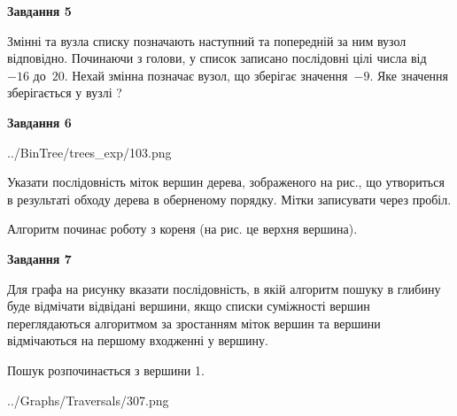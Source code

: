 \documentclass[12pt, ukrainian]{article}
\begin{document}
{\begin {large}
{\begin {center}\textbf{Завдання 5}\end {center}}\par
Змінні  та  вузла списку позначають наступний та попередній за ним вузол відповідно. Починаючи з голови, у список записано послідовні цілі числа від~$-16$ до~$20$. Нехай змінна  позначає вузол, що зберігає значення~$-9$.
Яке значення зберігається у вузлі  ?\par
\newpage

{\begin {center}\textbf{Завдання 6}\end {center}}\par

\begin{center}
	{../BinTree/trees_exp/103.png}
\end{center}
Указати послідовність міток вершин дерева, зображеного на рис., що утвориться в результаті обходу дерева в оберненому порядку. Мітки записувати через пробіл.\par Алгоритм починає роботу з кореня (на рис. це верхня вершина).\par
\newpage

{\begin {center}\textbf{Завдання 7}\end {center}}\par
Для графа на рисунку вказати послідовність, в якій алгоритм пошуку в глибину буде відмічати відвідані вершини, якщо списки суміжності вершин переглядаються алгоритмом за зростанням міток вершин та вершини відмічаються на першому вход\-женні у вершину.\par
Пошук розпочинається з вершини 1.\par

\begin{center}
	{../Graphs/Traversals/307.png}
\end{center}\par
\newpage


\end{large}}
\end{document}
